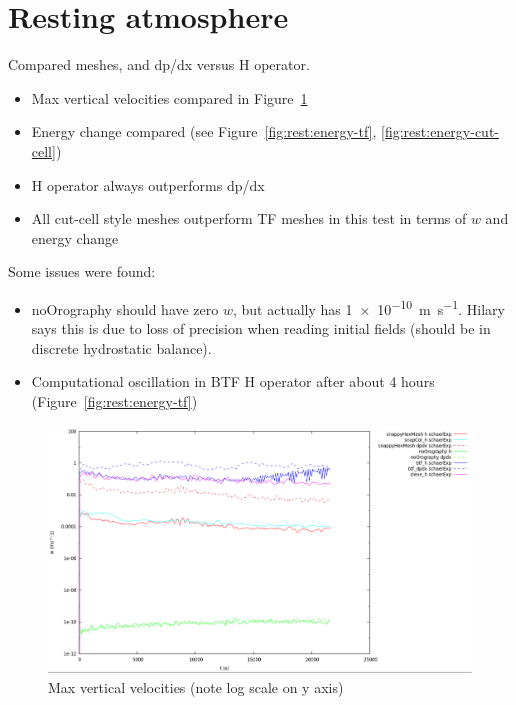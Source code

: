 \section{Resting atmosphere}
Compared meshes, and dp/dx versus H operator.

\begin{itemize}
\item Max vertical velocities compared in Figure~\ref{fig:rest:w}
\item Energy change compared (see Figure~\ref{fig:rest:energy-tf}, \ref{fig:rest:energy-cut-cell})
\item H operator always outperforms dp/dx
\item All cut-cell style meshes outperform TF meshes in this test in terms of $w$ and energy change
\end{itemize}
Some issues were found:
\begin{itemize}
\item noOrography should have zero $w$, but actually has \SI{1e-10}{\meter\per\second}.  Hilary says this is due to loss of precision when reading initial fields (should be in discrete hydrostatic balance).
\item Computational oscillation in BTF H operator after about 4 hours (Figure~\ref{fig:rest:energy-tf})
\end{itemize}

\begin{figure}
\includegraphics[width=\textwidth]{interim-results/verticalVelocityPlotSnappyHexMesh.png}
\caption{Max vertical velocities (note log scale on y axis)}
\label{fig:rest:w}
\end{figure}

